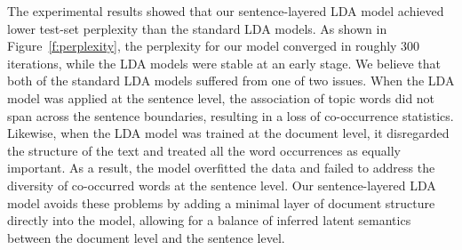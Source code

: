 The experimental results showed that our sentence-layered LDA model achieved
lower test-set perplexity than the standard LDA models.  As shown in
Figure~\ref{f:perplexity}, the perplexity for our model converged in roughly
300 iterations, while the LDA models were stable at an early stage.  We
believe that both of the standard LDA models suffered from one of two issues.
When the LDA model was applied at the sentence level, the association of
topic words did not span across the sentence boundaries, resulting in a loss of
co-occurrence statistics.  Likewise, when the LDA model was trained at the
document level, it disregarded the structure of the text and treated all the
word occurrences as equally important.  As a result, the model overfitted the
data and failed to address the diversity of co-occurred words at the sentence
level.  Our sentence-layered LDA model avoids these problems by adding a
minimal layer of document structure directly into the model, allowing for a
balance of inferred latent semantics between the document level and the
sentence level.

% 
% 

